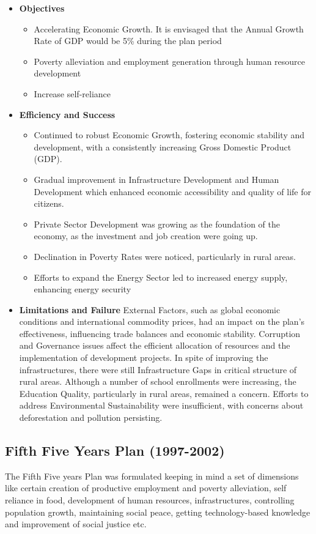 \begin{itemize}
	\item\textbf{Objectives}
	\begin{itemize}
		\item Accelerating Economic Growth. It is envisaged that the Annual Growth Rate of GDP 
		would be 5\% during the plan period
		\item Poverty alleviation and employment generation through human resource development
		\item Increase self-reliance
	\end{itemize}
	
	\item\textbf{Efficiency and Success}
	\begin{itemize}
		\item Continued to robust Economic Growth, fostering economic stability and development, 
		with a consistently increasing Gross Domestic Product (GDP).
		\item Gradual improvement in Infrastructure Development and Human Development which enhanced 
		economic accessibility and quality of life for citizens.
		\item Private Sector Development was growing as the foundation of the economy, as 
		the investment and job creation were going up.
		\item Declination in Poverty Rates were noticed, particularly in rural areas.
		\item Efforts to expand the Energy Sector led to increased energy supply, enhancing energy security
	\end{itemize}
	
	\item\textbf{Limitations and Failure}
	External Factors, such as global economic conditions and international commodity prices, 
	had an impact on the plan’s effectiveness, influencing trade balances and economic stability. 
	Corruption and Governance issues affect the efficient allocation of resources and 
	the implementation of development projects. In spite of improving the infrastructures, 
	there were still Infrastructure Gaps in critical structure of rural areas.
	Although a number of school enrollments were increasing, the Education Quality, 
	particularly in rural areas, remained a concern. Efforts to address Environmental Sustainability 
	were insufficient, with concerns about deforestation and pollution persisting.
\end{itemize}


\subsection{Fifth Five Years Plan (1997-2002)}
The Fifth Five years Plan was formulated keeping in mind a set of dimensions like certain
creation of productive employment and poverty alleviation, self reliance in food, development
of human resources, infrastructures, controlling population growth, maintaining social peace,
getting technology-based knowledge and improvement of social justice etc.

